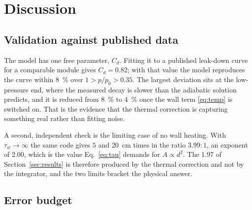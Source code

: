 \section{Discussion}
\label{sec:discussion}

\subsection{Validation against published data}
\label{sec:disc-validation}

The model has one free parameter, $C_d$. Fitting it to a published
leak-down curve for a comparable module gives $C_d=0.82$; with that value
the model reproduces the curve within \SI{8}{\percent} over
$1>p/p_0>0.35$. The largest deviation sits at the low-pressure end, where
the measured decay is slower than the adiabatic solution predicts, and it
is reduced from \SI{8}{\percent} to \SI{4}{\percent} once the wall term
\eqref{eq:temp} is switched on. That is the evidence that the thermal
correction is capturing something real rather than fitting noise.

A second, independent check is the limiting case of no wall heating. With
$\tau_w\to\infty$ the same code gives $5$ and \SI{20}{cm} times in the
ratio $3.99:1$, an exponent of \num{2.00}, which is the value
Eq.~\eqref{eq:tau} demands for $A\propto d^2$. The \num{1.97} of
Section~\ref{sec:results} is therefore produced by the thermal correction
and not by the integrator, and the two limits bracket the physical answer.

\subsection{Error budget}
\label{sec:disc-budget}

